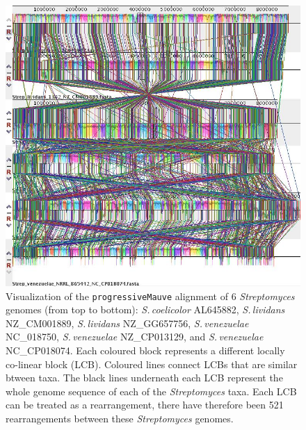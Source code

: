 \documentclass[11pt]{article}
\newcommand{\strep}{\textit{Streptomyces}\xspace}
\newcommand{\p}{\texttt{progressiveMauve}\xspace}
\newcommand{\sliv}{\textit{S.\,lividans}\xspace}
\newcommand{\sven}{\textit{S.\,venezuelae}\xspace}
\newcommand{\scoe}{\textit{S.\,coelicolor}\xspace}
\begin{document}
	\begin{figure}[H]
	\begin{center}
		\includegraphics[width=\textwidth]{./figs/6_strep_strains_mauve_aln_pic}
		\caption{\label{fig:strep6mauvealn} Visualization of the \p alignment of 6 \strep genomes (from top to bottom): \scoe AL645882, \sliv NZ\_CM001889, \sliv NZ\_GG657756, \sven NC\_018750, \sven NZ\_CP013129, and \sven NC\_CP018074. Each coloured block represents a different locally co-linear block (LCB). Coloured lines connect LCBs that are similar btween taxa. The black lines underneath each LCB represent the whole genome sequence of each of the \strep taxa. Each LCB can be treated as a rearrangement, there have therefore been 521 rearrangements between these \strep genomes.}
	\end{center}
\end{figure}
\end{document}
